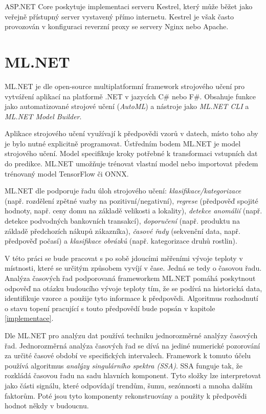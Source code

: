 ASP.NET Core poskytuje implementaci serveru Kestrel, který může běžet jako veřejně přístupný server vystavený přímo internetu. Kestrel je však často provozován v konfiguraci reverzní proxy se servery Nginx nebo Apache.


\section{ML.NET}
ML.NET je dle \cite{what_is_mlnet1} open-source multiplatformní framework strojového učení pro vytváření aplikací na platformě .NET v jazycích C\# nebo F\#. Obsahuje funkce jako automatizované strojové učení ({\it AutoML}) a nástroje jako {\it ML.NET CLI} a {\it ML.NET Model Builder}.

Aplikace strojového učení využívají k předpovědi vzorů v datech, místo toho aby je bylo nutné explicitně programovat. Ústředním bodem ML.NET je model strojového učení. Model specifikuje kroky potřebné k transformaci vstupních dat do predikce. ML.NET umožňuje trénovat vlastní model nebo importovat předem trénovaný model TensorFlow či ONNX.

ML.NET dle \cite{what_is_mlnet2} podporuje řadu úloh strojového učení: {\it klasifikace/kategorizace} (např. rozdělení zpětné vazby na pozitivní/negativní), {\it regrese} (předpověď spojité hodnoty, např. ceny domu na základě velikosti a lokality), {\it detekce anomálií} (např. detekce podvodných bankovních transakcí), {\it doporučení} (např. produktu na základě předchozích nákupů zákazníka), {\it časové řady} (sekvenční data, např. předpověď počasí) a {\it klasifikace obrázků} (např. kategorizace druhů rostlin).

V této práci se bude pracovat s po sobě jdoucími měřeními vývoje teploty v místnosti, které se určitým způsobem vyvíjí v čase. Jedná se tedy o časovou řadu. Analýza časových řad podporovaná frameworkem ML.NET pomáhá poskytnout odpověď na otázku budoucího vývoje teploty tím, že se podívá na historická data, identifikuje vzorce a použije tyto informace k předpovědi. Algoritmus rozhodnutí o stavu topení pracující s touto předpovědí bude popsán v kapitole \ref{implementace}.

Dle \cite{mlnet_tutorial} ML.NET pro analýzu dat používá techniku jednorozměrné analýzy časových řad. Jednorozměrná analýza časových řad se dívá na jediné numerické pozorování za určité časové období ve specifických intervalech. Framework k tomuto účelu používá algoritmus {\it analýzy singulárního spektra (SSA)}. SSA funguje tak, že rozkládá časovou řadu na sadu hlavních komponent. Tyto složky lze interpretovat jako části signálu, které odpovídají trendům, šumu, sezónnosti a mnoha dalším faktorům. Poté jsou tyto komponenty rekonstruovány a použity k předpovědi hodnot někdy v budoucnu.

